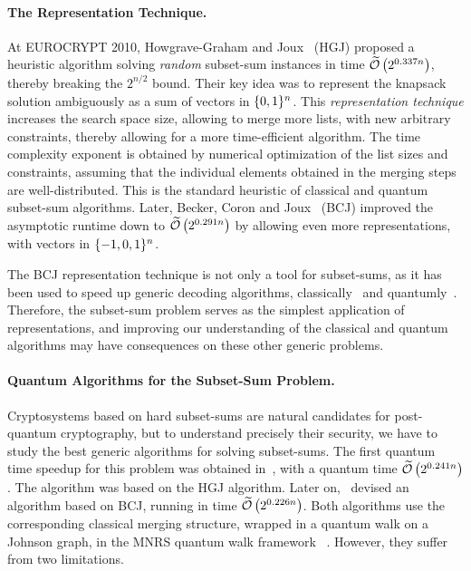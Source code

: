 \paragraph{The Representation Technique.}
At EUROCRYPT 2010, Howgrave-Graham and Joux~\cite{DBLP:conf/eurocrypt/Howgrave-GrahamJ10} (HGJ) proposed a heuristic algorithm solving \emph{random} subset-sum instances in time $\widetilde{\mathcal{O}} \left(2^{0.337 n} \right)$, thereby breaking the $2^{n/2}$ bound. Their key idea was to represent the knapsack solution ambiguously as a sum of vectors in $\{0,1\}^n$. This \emph{representation technique} increases the search space size, allowing to merge more lists, with new arbitrary  constraints, thereby allowing for a more time-efficient algorithm. The time complexity exponent is obtained by numerical optimization of the list sizes and constraints, assuming that the individual elements obtained in the merging steps are well-distributed. This is the standard heuristic of classical and quantum subset-sum algorithms. Later, Becker, Coron and Joux~\cite{DBLP:conf/eurocrypt/BeckerCJ11} (BCJ) improved the asymptotic runtime down to $\widetilde{\mathcal{O}} \left(2^{0.291 n} \right)$ by allowing even more representations, with vectors in $\{-1,0,1\}^n$.

The BCJ representation technique is not only a tool for subset-sums, as it has been used to speed up generic decoding algorithms, classically~\cite{DBLP:conf/asiacrypt/MayMT11,DBLP:conf/eurocrypt/BeckerJMM12,DBLP:conf/eurocrypt/0001O15} and quantumly~\cite{DBLP:conf/pqcrypto/KachigarT17}. Therefore, the subset-sum problem serves as the simplest application of representations, and improving our understanding of the classical and quantum algorithms may have consequences on these other generic problems.

\paragraph{Quantum Algorithms for the Subset-Sum Problem.}
Cryptosystems based on hard subset-sums are natural candidates for post-quantum cryptography, but to understand precisely their security, we have to study the best generic algorithms for solving subset-sums. The first quantum time speedup for this problem was obtained in~\cite{DBLP:conf/pqcrypto/BernsteinJLM13}, with a quantum time $\widetilde{\mathcal{O}} \left(2^{0.241 n} \right)$. The algorithm was based on the HGJ algorithm. Later on,~\cite{DBLP:conf/tqc/HelmM18} devised an algorithm based on BCJ, running in time $\widetilde{\mathcal{O}} \left(2^{0.226 n} \right)$. Both algorithms use the corresponding classical merging structure, wrapped in a quantum walk on a Johnson graph, in the MNRS quantum walk framework ~\cite{mnrs11}. However, they suffer from two limitations. 

